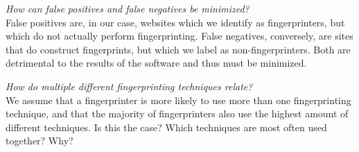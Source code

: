 \documentclass[
    fontsize=12pt,
    headings=small,
    parskip=half,
    bibliography=totoc,
    numbers=noenddot,
    open=any
    ]{scrreprt}
\begin{document}
\textit{How can false positives and false negatives be minimized?}\\
False positives are, in our case, websites which we identify as fingerprinters, but which do not actually
perform fingerprinting. False negatives, conversely, are sites that do construct fingerprints, but which we
label as non-fingerprinters.
Both are detrimental to the results of the software and thus must be minimized.

\textit{How do multiple different fingerprinting techniques relate?}\\
We assume that a fingerprinter is more likely to use more than one fingerprinting technique,
and that the majority of fingerprinters also use the highest amount of different techniques.
Is this the case? Which techniques are most often used together? Why?
\end{document}
